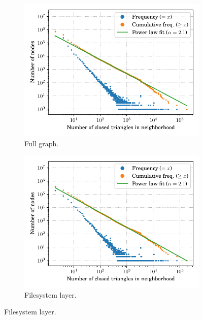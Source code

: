 \begin{figure}
    \begin{subfigure}{.49\textwidth}
        \centering
        \includegraphics[width=\linewidth]{img/topology/clusteringcoeff/full}
        \caption{Full graph.}%
        \label{fig:clustering_full}
    \end{subfigure}\hfill
    \begin{subfigure}{.49\textwidth}
        \centering
        \includegraphics[width=\linewidth]{img/topology/clusteringcoeff/dir+cnt}
        \caption{Filesystem layer.}%
        \label{fig:clustering_dir+cnt}
    \end{subfigure}
    \newline

\end{figure}
